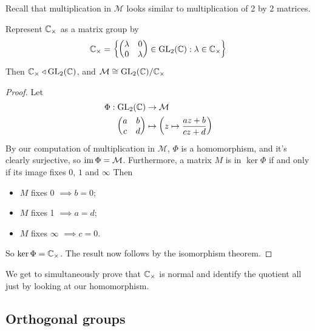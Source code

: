 \documentclass{../../template/note}
\begin{document}
    Recall that multiplication in \(\mathcal M\) looks similar to multiplication of 2 by 2 matrices.
    
    \begin{proposition}
        Represent \(\mathbb C_\times\) as a matrix group by 
        \[
            \mathbb C_\times = \left\{\begin{pmatrix}
             \lambda & 0 \\
             0 & \lambda \\
            \end{pmatrix} \in \operatorname{GL}_2(\mathbb C): \lambda \in \mathbb C_\times\right\}
        \]
        Then \(\mathbb C_\times \triangleleft \operatorname{GL}_2(\mathbb C)\), and \(\mathcal M \cong \operatorname{GL}_2(\mathbb C)/\mathbb C_\times\)
    \end{proposition}
    
    \begin{proof}
        Let
        \begin{align*}
            \Phi: \operatorname{GL}_2(\mathbb C) &\to \mathcal M \\
            \begin{pmatrix}
             a & b \\
             c & d \\
            \end{pmatrix} &\mapsto \left(z \mapsto \frac{az+b}{cz+d}\right)
        \end{align*}
        By our computation of multiplication in \(\mathcal M\), \(\Phi\) is a homomorphism, and it's clearly surjective, so \(\operatorname{im} \Phi = \mathcal M\). Furthermore, a matrix \(M\) is in \(\ker \Phi\) if and only if its image fixes \(0\), \(1\) and \(\infty\) Then
        \begin{itemize}
            \item \(M\) fixes 0 \(\implies b = 0\);
            \item \(M\) fixes 1 \(\implies a = d\);
            \item \(M\) fixes \(\infty\) \(\implies c = 0\).
        \end{itemize}
        So \(\ker \Phi = \mathbb C_\times\). The result now follows by the isomorphism theorem.
    \end{proof}
    
    \begin{remark*}
        We get to simultaneously prove that \(\mathbb C_\times\) is normal and identify the quotient all just by looking at our homomorphism.
    \end{remark*}
    
    \subsection{Orthogonal groups}
\end{document}
